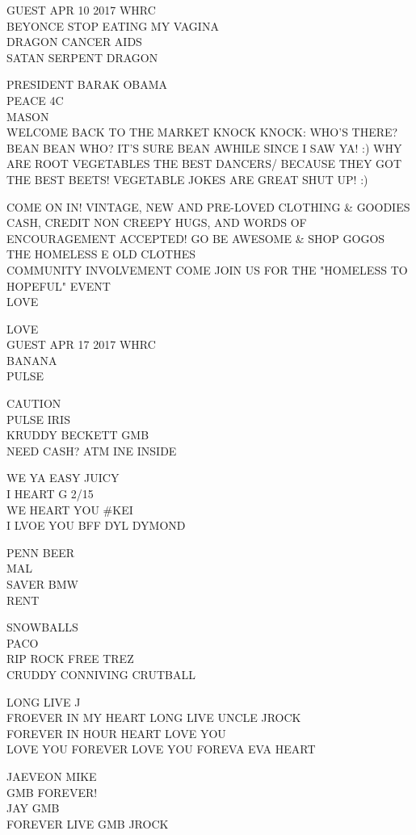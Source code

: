 \documentclass[10pt,letterpaper]{article}
\begin{document}
GUEST APR 10 2017 WHRC\\
BEYONCE STOP EATING MY VAGINA\\
DRAGON CANCER AIDS\\
SATAN SERPENT DRAGON

PRESIDENT BARAK OBAMA\\
PEACE 4C\\
MASON\\
WELCOME BACK TO THE MARKET KNOCK KNOCK: WHO'S THERE? BEAN BEAN WHO?  IT'S SURE BEAN AWHILE SINCE I SAW YA!  :) WHY ARE ROOT VEGETABLES THE BEST DANCERS/  BECAUSE THEY GOT THE BEST BEETS!  VEGETABLE JOKES ARE GREAT SHUT UP! :)

COME ON IN!  VINTAGE, NEW AND PRE{-}LOVED CLOTHING \& GOODIES CASH, CREDIT NON CREEPY HUGS, AND WORDS OF ENCOURAGEMENT ACCEPTED!  GO BE AWESOME \& SHOP GOGOS\\
THE HOMELESS E OLD CLOTHES\\
COMMUNITY INVOLVEMENT COME JOIN US FOR THE "HOMELESS TO HOPEFUL" EVENT\\
LOVE

LOVE\\
GUEST APR 17 2017 WHRC\\
BANANA\\
PULSE

CAUTION\\
PULSE IRIS\\
KRUDDY BECKETT GMB\\
NEED CASH?  ATM INE INSIDE

WE YA EASY JUICY\\
I HEART G 2/15\\
WE HEART YOU \#KEI\\
I LVOE YOU BFF DYL DYMOND

PENN BEER\\
MAL\\
SAVER BMW\\
RENT

SNOWBALLS\\
PACO\\
RIP ROCK FREE TREZ\\
CRUDDY CONNIVING CRUTBALL

LONG LIVE J\\
FROEVER IN MY HEART LONG LIVE UNCLE JROCK\\
FOREVER IN HOUR HEART LOVE YOU\\
LOVE YOU FOREVER LOVE YOU FOREVA EVA HEART

JAEVEON MIKE\\
GMB FOREVER!\\
JAY GMB\\
FOREVER LIVE GMB JROCK
\end{document}
